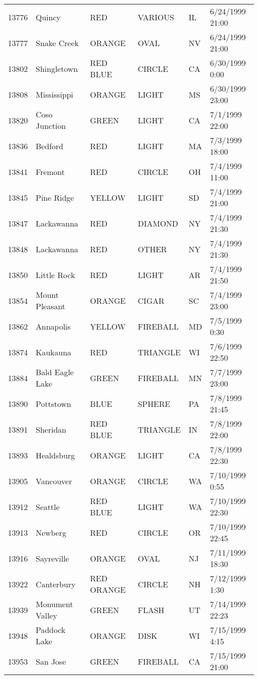 \begin{tabular}{llllll}
13776 & Quincy & RED & VARIOUS & IL & 6/24/1999 21:00 \\
13777 & Snake Creek & ORANGE & OVAL & NV & 6/24/1999 21:00 \\
13802 & Shingletown & RED BLUE & CIRCLE & CA & 6/30/1999 0:00 \\
13808 & Mississippi & ORANGE & LIGHT & MS & 6/30/1999 23:00 \\
13820 & Coso Junction & GREEN & LIGHT & CA & 7/1/1999 22:00 \\
13836 & Bedford & RED & LIGHT & MA & 7/3/1999 18:00 \\
13841 & Fremont & RED & CIRCLE & OH & 7/4/1999 11:00 \\
13845 & Pine Ridge & YELLOW & LIGHT & SD & 7/4/1999 21:00 \\
13847 & Lackawanna & RED & DIAMOND & NY & 7/4/1999 21:30 \\
13848 & Lackawanna & RED & OTHER & NY & 7/4/1999 21:30 \\
13850 & Little Rock & RED & LIGHT & AR & 7/4/1999 21:50 \\
13854 & Mount Pleasant & ORANGE & CIGAR & SC & 7/4/1999 23:00 \\
13862 & Annapolis & YELLOW & FIREBALL & MD & 7/5/1999 0:30 \\
13874 & Kaukauna & RED & TRIANGLE & WI & 7/6/1999 22:50 \\
13884 & Bald Eagle Lake & GREEN & FIREBALL & MN & 7/7/1999 23:00 \\
13890 & Pottstown & BLUE & SPHERE & PA & 7/8/1999 21:45 \\
13891 & Sheridan & RED BLUE & TRIANGLE & IN & 7/8/1999 22:00 \\
13893 & Healdsburg & ORANGE & LIGHT & CA & 7/8/1999 22:30 \\
13905 & Vancouver & ORANGE & CIRCLE & WA & 7/10/1999 0:55 \\
13912 & Seattle & RED BLUE & LIGHT & WA & 7/10/1999 22:30 \\
13913 & Newberg & RED & CIRCLE & OR & 7/10/1999 22:45 \\
13916 & Sayreville & ORANGE & OVAL & NJ & 7/11/1999 18:30 \\
13922 & Canterbury & RED ORANGE & CIRCLE & NH & 7/12/1999 1:30 \\
13939 & Monument Valley & GREEN & FLASH & UT & 7/14/1999 22:23 \\
13948 & Paddock Lake & ORANGE & DISK & WI & 7/15/1999 4:15 \\
13953 & San Jose & GREEN & FIREBALL & CA & 7/15/1999 21:00 \\

\end{tabular}

